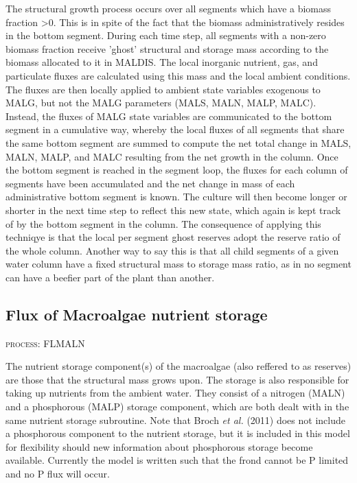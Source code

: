 \documentclass{deltares_manual}
\begin{document}
The structural growth process occurs over all segments which have a biomass fraction \textgreater 0. This is in spite of the fact that the biomass administratively resides in the bottom segment. During each time step, all segments with a non-zero biomass fraction receive 'ghost' structural and storage mass according to the biomass allocated to it in MALDIS. The local inorganic nutrient, gas, and particulate fluxes are calculated using this mass and the local ambient conditions. The fluxes are then locally applied to ambient state variables exogenous to MALG, but not the MALG parameters (MALS, MALN, MALP, MALC). Instead, the fluxes of MALG state variables are communicated to the bottom segment in a cumulative way, whereby the local fluxes of all segments that share the same bottom segment are summed to compute the net total change in MALS, MALN, MALP, and MALC resulting from the net growth in the column. Once the bottom segment is reached in the segment loop, the fluxes for each column of segments have been accumulated and the net change in mass of each administrative bottom segment is known. The culture will then become longer or shorter in the next time step to reflect this new state, which again is kept track of by the bottom segment in the column. The consequence of applying this techniqye is that the local per segment ghost reserves adopt the reserve ratio of the whole column. Another way to say this is that all child segments of a given water column have a fixed structural mass to storage mass ratio, as in no segment can have a beefier part of the plant than another.

\subsection{Flux of Macroalgae nutrient storage}
\begin{flushright}
\textsc{process: FLMALN}
\end{flushright}

The nutrient storage component(s) of the macroalgae (also reffered to as reserves) are those that the structural mass grows upon. The storage is also responsible for taking up nutrients from the ambient water. They consist of a nitrogen (MALN) and a phosphorous (MALP) storage component, which are both dealt with in the same nutrient storage subroutine. Note that Broch \textit{et al.} (2011) does not include a phosphorous component to the nutrient storage, but it is included in this model for flexibility should new information about phosphorous storage become available. Currently the model is written such that the frond cannot be P limited and no P flux will occur.
\end{document}
